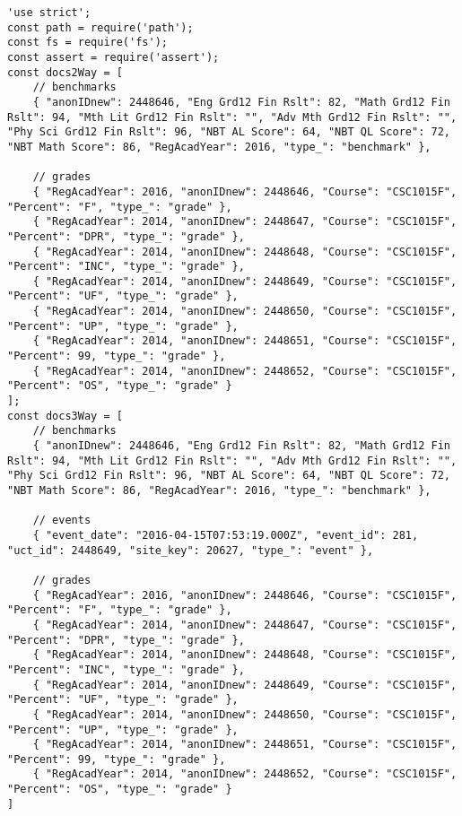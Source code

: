 \label{Map-List-tests}
\begin{verbatim}
'use strict';
const path = require('path');
const fs = require('fs');
const assert = require('assert');
const docs2Way = [
    // benchmarks
    { "anonIDnew": 2448646, "Eng Grd12 Fin Rslt": 82, "Math Grd12 Fin Rslt": 94, "Mth Lit Grd12 Fin Rslt": "", "Adv Mth Grd12 Fin Rslt": "", "Phy Sci Grd12 Fin Rslt": 96, "NBT AL Score": 64, "NBT QL Score": 72, "NBT Math Score": 86, "RegAcadYear": 2016, "type_": "benchmark" },

    // grades
    { "RegAcadYear": 2016, "anonIDnew": 2448646, "Course": "CSC1015F", "Percent": "F", "type_": "grade" },
    { "RegAcadYear": 2014, "anonIDnew": 2448647, "Course": "CSC1015F", "Percent": "DPR", "type_": "grade" },
    { "RegAcadYear": 2014, "anonIDnew": 2448648, "Course": "CSC1015F", "Percent": "INC", "type_": "grade" },
    { "RegAcadYear": 2014, "anonIDnew": 2448649, "Course": "CSC1015F", "Percent": "UF", "type_": "grade" },
    { "RegAcadYear": 2014, "anonIDnew": 2448650, "Course": "CSC1015F", "Percent": "UP", "type_": "grade" },
    { "RegAcadYear": 2014, "anonIDnew": 2448651, "Course": "CSC1015F", "Percent": 99, "type_": "grade" },
    { "RegAcadYear": 2014, "anonIDnew": 2448652, "Course": "CSC1015F", "Percent": "OS", "type_": "grade" }
];
const docs3Way = [
    // benchmarks
    { "anonIDnew": 2448646, "Eng Grd12 Fin Rslt": 82, "Math Grd12 Fin Rslt": 94, "Mth Lit Grd12 Fin Rslt": "", "Adv Mth Grd12 Fin Rslt": "", "Phy Sci Grd12 Fin Rslt": 96, "NBT AL Score": 64, "NBT QL Score": 72, "NBT Math Score": 86, "RegAcadYear": 2016, "type_": "benchmark" },

    // events
    { "event_date": "2016-04-15T07:53:19.000Z", "event_id": 281, "uct_id": 2448649, "site_key": 20627, "type_": "event" },

    // grades
    { "RegAcadYear": 2016, "anonIDnew": 2448646, "Course": "CSC1015F", "Percent": "F", "type_": "grade" },
    { "RegAcadYear": 2014, "anonIDnew": 2448647, "Course": "CSC1015F", "Percent": "DPR", "type_": "grade" },
    { "RegAcadYear": 2014, "anonIDnew": 2448648, "Course": "CSC1015F", "Percent": "INC", "type_": "grade" },
    { "RegAcadYear": 2014, "anonIDnew": 2448649, "Course": "CSC1015F", "Percent": "UF", "type_": "grade" },
    { "RegAcadYear": 2014, "anonIDnew": 2448650, "Course": "CSC1015F", "Percent": "UP", "type_": "grade" },
    { "RegAcadYear": 2014, "anonIDnew": 2448651, "Course": "CSC1015F", "Percent": 99, "type_": "grade" },
    { "RegAcadYear": 2014, "anonIDnew": 2448652, "Course": "CSC1015F", "Percent": "OS", "type_": "grade" }
]


\end{verbatim}

